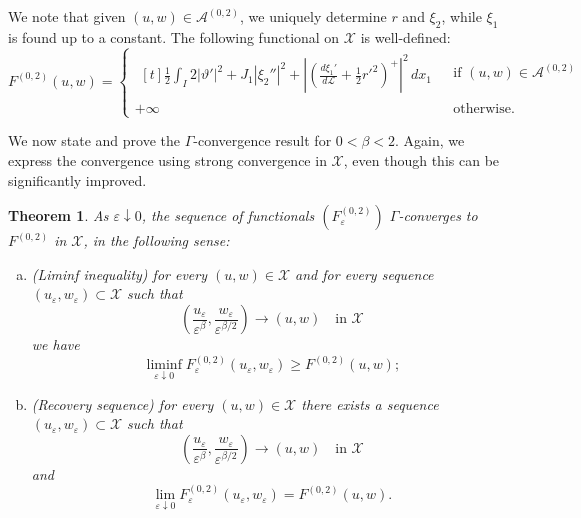\documentclass[a4, 11pt, reqno, final]{amsart}
\newcommand{\calA}{\mathcal{A}}
\newcommand{\calL}{\mathcal{L}}
\newcommand{\calX}{\mathcal{X}}
\newcommand\e{\varepsilon}
\theoremstyle{plain}%
\newtheorem{theorem}{Theorem}[section]
\begin{document}
	We note that given $(u,w) \in \calA^{(0,2)}$, we uniquely determine $r$ and $\xi_2$, while $\xi_1$ is found up to a constant. The following
	functional on $\calX$ is well-defined:
	$$ F^{(0,2)}(u,w) = \begin{cases}
		\begin{multlined}[t]
			\frac12\int_I 2|\vartheta'|^2 + J_1|\xi_2''|^2  +  |(\frac{d\xi_1'}{d\calL} + \frac12 r'^2)^+|^2 \, dx_1
		\end{multlined} & \text{ if } (u,w)\in\calA^{(0,2)}\\
		+\infty & \text{ otherwise}.
	\end{cases}$$

	We now state and prove the $\Gamma$-convergence result for $0<\beta < 2$. Again, we express the convergence using strong convergence in $\mathcal{X}$, even though this can be significantly improved.
	\begin{theorem}\label{thm:gc222}
		As $\e\downarrow 0$, the sequence of functionals $(F_{\e}^{(0,2)})$ $\Gamma$-converges to $F^{(0,2)}$ in $\calX$, in the following sense:
		\begin{enumerate}[(a)]
			\item (Liminf inequality) for every $(u,w)\in \calX$ and for every sequence $(u_\e, w_\e)\subset \calX$ such that
			$$
			(\frac{u_\e}{\e^\beta},\frac{w_\e}{\e^{\beta/2}})\to (u,w)\quad \mbox{in }\calX
			$$
			we have
			\begin{equation*}
				\liminf\limits_{\e\downarrow 0} F_{\e}^{(0,2)}(u_\e, w_\e)\geq F^{(0,2)}(u,w);
			\end{equation*}
			\item (Recovery sequence)
			for every  $(u,w)\in \calX$ there exists a sequence $(u_\e, w_\e)\subset \calX$ such that
			$$
			(\frac{u_\e}{\e^\beta},\frac{w_\e}{\e^{\beta/2}})\to (u,w)\quad \mbox{in }\calX
			$$
			and
			\begin{equation*}
				\lim\limits_{\e\downarrow 0} F_{\e}^{(0,2)}(u_\e, w_\e) = F^{(0,2)}(u,w).
			\end{equation*}
		\end{enumerate}
	\end{theorem}
\end{document}
